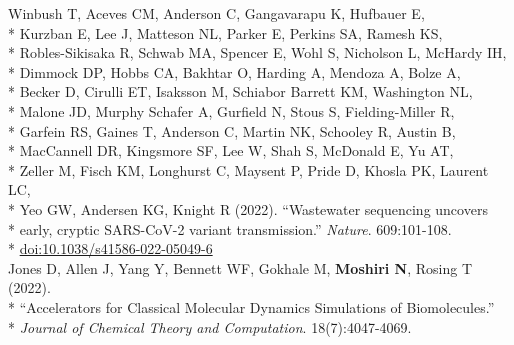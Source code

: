 \documentclass[margin,line]{res}
\begin{document}
\begin{resume}
\hspace*{9mm} Winbush T, Aceves CM, Anderson C, Gangavarapu K, Hufbauer E,\\*
\hspace*{9mm} Kurzban E, Lee J, Matteson NL, Parker E, Perkins SA, Ramesh KS,\\*
\hspace*{9mm} Robles-Sikisaka R, Schwab MA, Spencer E, Wohl S, Nicholson L, McHardy IH,\\*
\hspace*{9mm} Dimmock DP, Hobbs CA, Bakhtar O, Harding A, Mendoza A, Bolze A,\\*
\hspace*{9mm} Becker D, Cirulli ET, Isaksson M, Schiabor Barrett KM, Washington NL,\\*
\hspace*{9mm} Malone JD, Murphy Schafer A, Gurfield N, Stous S, Fielding-Miller R,\\*
\hspace*{9mm} Garfein RS, Gaines T, Anderson C, Martin NK, Schooley R, Austin B,\\*
\hspace*{9mm} MacCannell DR, Kingsmore SF, Lee W, Shah S, McDonald E, Yu AT,\\*
\hspace*{9mm} Zeller M, Fisch KM, Longhurst C, Maysent P, Pride D, Khosla PK, Laurent LC,\\*
\hspace*{9mm} Yeo GW, Andersen KG, Knight R (2022). ``Wastewater sequencing uncovers\\*
\hspace*{9mm} early, cryptic SARS-CoV-2 variant transmission.'' \textit{Nature}. 609:101-108.\\*\vspace{2mm}
\hspace*{8mm} \href{https://doi.org/10.1038/s41586-022-05049-6}{doi:10.1038/s41586-022-05049-6}\\
\hspace*{4mm} Jones D, Allen J, Yang Y, Bennett WF, Gokhale M, \textbf{Moshiri N}, Rosing T (2022).\\*
\hspace*{9mm} ``Accelerators for Classical Molecular Dynamics Simulations of Biomolecules.''\\*\vspace{2mm}
\hspace*{8mm} \textit{Journal of Chemical Theory and Computation}. 18(7):4047-4069.\\

\end{resume}
\end{document}
